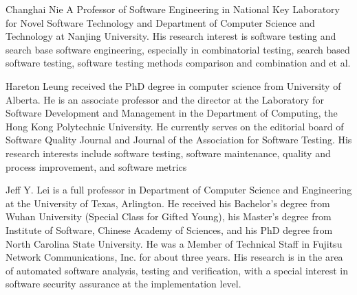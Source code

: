 \documentclass[10pt,journal,cspaper,compsoc]{IEEEtran}
\begin{document}
\begin{IEEEbiography}{Changhai Nie}
A Professor of Software Engineering in National Key Laboratory for Novel Software Technology and Department of Computer Science and Technology at Nanjing University. His research interest is software testing and search base software engineering, especially in combinatorial testing, search based software testing, software testing methods comparison and combination and et al.
\end{IEEEbiography}

\begin{IEEEbiography}{Hareton Leung}
received the PhD degree in computer science from University of Alberta. He is an associate professor and the director at the Laboratory for Software Development and Management in the Department of Computing, the Hong Kong Polytechnic University. He currently serves on the editorial board of Software Quality Journal and Journal of the Association for Software Testing. His research interests include software testing, software maintenance, quality and process improvement, and software metrics
\end{IEEEbiography}

\begin{IEEEbiography}{Jeff Y. Lei}
is a full professor in Department of Computer Science and Engineering at the University of Texas, Arlington. He received his Bachelor's degree from Wuhan University (Special Class for Gifted Young), his Master's degree from Institute of Software, Chinese Academy of Sciences, and his PhD degree from North Carolina State University. He was a Member of Technical Staff in Fujitsu Network Communications, Inc. for about three years. His research is in the area of automated software analysis, testing and verification, with a special interest in software security assurance at the implementation level.
\end{IEEEbiography}
\end{document}
